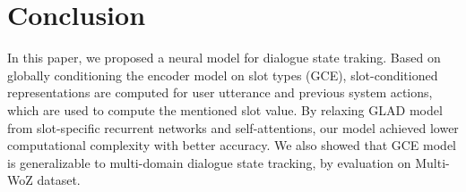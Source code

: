 \documentclass{article}
\begin{document}
\section{Conclusion}
In this paper, we proposed a neural model for dialogue state traking. Based on globally conditioning the encoder model on slot types (GCE), slot-conditioned representations are computed for user utterance and previous system actions, which are used to compute the mentioned slot value. By relaxing GLAD model from slot-specific recurrent networks and self-attentions, our model achieved lower computational complexity with better accuracy. We also showed that GCE model is generalizable to multi-domain dialogue state tracking, by evaluation on Multi-WoZ dataset. 



\end{document}
